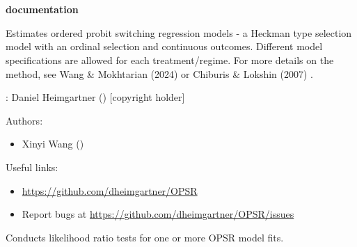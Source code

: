 \documentclass[letterpaper]{book}
\begin{document}
\chapter*{}
\begin{center}
{\textbf{\huge \R{} documentation}} \par{}
\par\bigskip{\large \today}
\end{center}
%
\begin{Description}
Estimates ordered probit switching regression models - a Heckman type selection model with an ordinal selection and continuous outcomes. Different model specifications are allowed for each treatment/regime. For more details on the method, see Wang \& Mokhtarian (2024)  or Chiburis \& Lokshin (2007) .
\end{Description}
%
\begin{Author}
: Daniel Heimgartner  () [copyright holder]

Authors:
\begin{itemize}

\item{} Xinyi Wang  ()

\end{itemize}


\end{Author}
%
\begin{SeeAlso}
Useful links:
\begin{itemize}

\item{} \url{https://github.com/dheimgartner/OPSR}
\item{} Report bugs at \url{https://github.com/dheimgartner/OPSR/issues}

\end{itemize}


\end{SeeAlso}
%
\begin{Description}
Conducts likelihood ratio tests for one or more OPSR model fits.
\end{Description}
\end{document}
